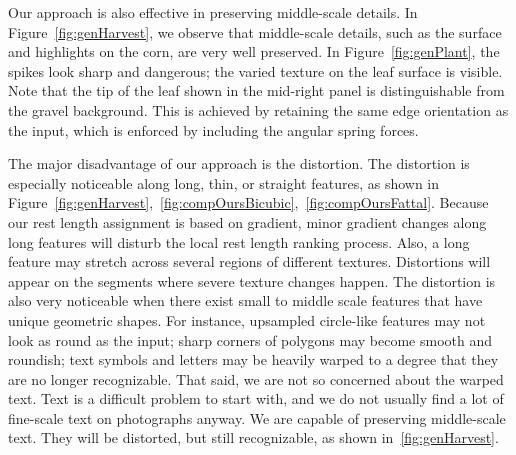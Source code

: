 Our approach is also effective in preserving middle-scale details. In Figure~\ref{fig:genHarvest}, we observe that middle-scale details, such as the surface and highlights on the corn, are very well preserved. In Figure~\ref{fig:genPlant}, the spikes look sharp and dangerous; the varied texture on the leaf surface is visible. Note that the tip of the leaf shown in the mid-right panel is distinguishable from the gravel background. This is achieved by retaining the same edge orientation as the input, which is enforced by including the angular spring forces. 


The major disadvantage of our approach is the distortion. The distortion is especially noticeable along long, thin, or straight features, as shown in Figure~\ref{fig:genHarvest},~\ref{fig:compOursBicubic},~\ref{fig:compOursFattal}. Because our rest length assignment is based on gradient, minor gradient changes along long features will disturb the local rest length ranking process. Also, a long feature may stretch across several regions of different textures. Distortions will appear on the segments where severe texture changes happen. The distortion is also very noticeable when there exist small to middle scale features that have unique geometric shapes. For instance, upsampled circle-like features may not look as round as the input; sharp corners of polygons may become smooth and roundish; text symbols and letters may be heavily warped to a degree that they are no longer recognizable. That said, we are not so concerned about the warped text. Text is a difficult problem to start with, and we do not usually find a lot of fine-scale text on photographs anyway. We are capable of preserving middle-scale text. They will be distorted, but still recognizable, as shown in~\ref{fig:genHarvest}.

